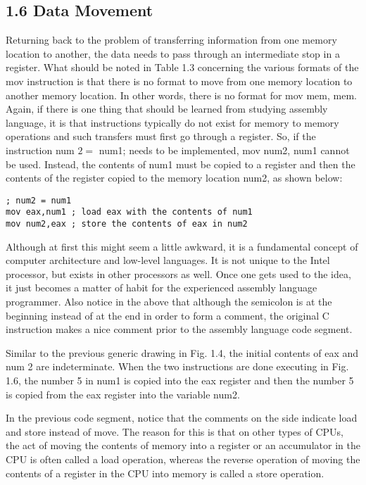\documentclass[10pt]{article}
\begin{document}
\subsection*{1.6 Data Movement}
Returning back to the problem of transferring information from one memory location to another, the data needs to pass through an intermediate stop in a register. What should be noted in Table 1.3 concerning the various formats of the mov instruction is that there is no format to move from one memory location to another memory location. In other words, there is no format for mov mem, mem. Again, if there is one thing that should be learned from studying assembly language, it is that instructions typically do not exist for memory to memory operations and such transfers must first go through a register. So, if the instruction num $2=$ num1; needs to be implemented, mov num2, num1 cannot be used. Instead, the contents of num1 must be copied to a register and then the contents of the register copied to the memory location num2, as shown below:

\begin{verbatim}
; num2 = num1
mov eax,num1 ; load eax with the contents of num1
mov num2,eax ; store the contents of eax in num2
\end{verbatim}

Although at first this might seem a little awkward, it is a fundamental concept of computer architecture and low-level languages. It is not unique to the Intel processor, but exists in other processors as well. Once one gets used to the idea, it just becomes a matter of habit for the experienced assembly language programmer. Also notice in the above that although the semicolon is at the beginning instead of at the end in order to form a comment, the original C instruction makes a nice comment prior to the assembly language code segment.

Similar to the previous generic drawing in Fig. 1.4, the initial contents of eax and num 2 are indeterminate. When the two instructions are done executing in Fig. 1.6, the number 5 in num1 is copied into the eax register and then the number 5 is copied from the eax register into the variable num2.

In the previous code segment, notice that the comments on the side indicate load and store instead of move. The reason for this is that on other types of CPUs, the act of moving the contents of memory into a register or an accumulator in the CPU is often called a load operation, whereas the reverse operation of moving the contents of a register in the CPU into memory is called a store operation.
\end{document}
